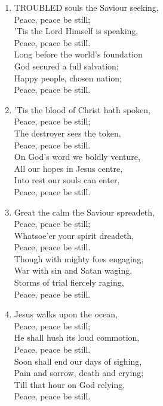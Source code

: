 \begin{enumerate}
    \item TROUBLED souls the Saviour seeking, \\
        Peace, peace be still; \\
        'Tis the Lord Himself is speaking, \\
        Peace, peace be still. \\
        Long before the world's foundation \\
        God secured a full salvation; \\
        Happy people, chosen nation; \\
        Peace, peace be still.

    \item 'Tis the blood of Christ hath spoken, \\
        Peace, peace be still; \\
        The destroyer sees the token, \\
        Peace, peace be still. \\
        On God's word we boldly venture, \\
        All our hopes in Jesus centre, \\
        Into rest our souls can enter, \\
        Peace, peace be still.

    \item Great the calm the Saviour spreadeth, \\
        Peace, peace be still; \\
        Whatsoe'er your spirit dreadeth, \\
        Peace, peace be still. \\
        Though with mighty foes engaging, \\
        War with sin and Satan waging, \\
        Storms of trial fiercely raging, \\
        Peace, peace be still.

    \item Jesus walks upon the ocean, \\
        Peace, peace be still; \\
        He shall hush its loud commotion, \\
        Peace, peace be still. \\
        Soon shall end our days of sighing, \\
        Pain and sorrow, death and crying; \\
        Till that hour on God relying, \\
        Peace, peace be still.

\end{enumerate}

